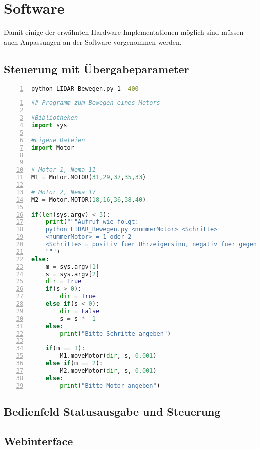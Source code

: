 \section{Software}
Damit einige der erwähnten Hardware Implementationen möglich sind müssen auch Anpassungen an der Software vorgenommen werden.
\subsection{Steuerung mit Übergabeparameter}
\begin{lstlisting}[caption={Beispiel Aufruf einer Python Funktion mit Übergabeparametern}, language={bash}, label={variables_calling}, numbers=left]
python LIDAR_Bewegen.py 1 -400
\end{lstlisting}

\begin{lstlisting}[caption={Python Beispiel Funktion welche Übergabeparamenter akzeptiert und ausführt}, language={python}, label={variables_function}, numbers=left]
## Programm zum Bewegen eines Motors

#Bibliotheken
import sys

#Eigene Dateien
import Motor


# Motor 1, Nema 11
M1 = Motor.MOTOR(31,29,37,35,33)

# Motor 2, Nema 17
M2 = Motor.MOTOR(18,16,36,38,40)

if(len(sys.argv) < 3):
    print("""Aufruf wie folgt:
    python LIDAR_Bewegen.py <nummerMotor> <Schritte>
    <nummerMotor> = 1 oder 2
    <Schritte> = positiv fuer Uhrzeigersinn, negativ fuer gegen den Uhrzeigersinn
    """)
else:
    m = sys.argv[1]
    s = sys.argv[2]
    dir = True
    if(s > 0):
        dir = True
    else if(s < 0):
        dir = False
        s = s * -1
    else:
        print("Bitte Schritte angeben")

    if(m == 1):
        M1.moveMotor(dir, s, 0.001)
    else if(m == 2):
        M2.moveMotor(dir, s, 0.001)
    else:
        print("Bitte Motor angeben")

\end{lstlisting}

\subsection{Bedienfeld Statusausgabe und Steuerung}

\subsection{Webinterface}



